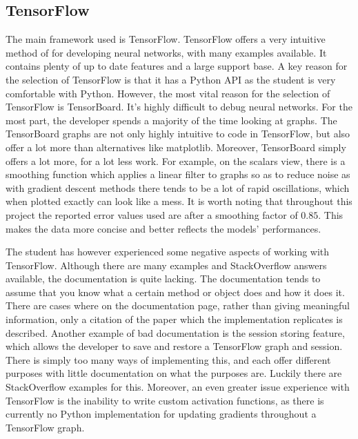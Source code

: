 \documentclass[12pt,a4paper,oneside,oldfontcommands]{memoir}
\begin{document}
\begin{Declaration Of OriginalityOrginality}
\subsection{TensorFlow}
The main framework used is TensorFlow. TensorFlow offers a very intuitive method of for developing neural networks, with many examples available. It contains plenty of up to date features and a large support base. A key reason for the selection of TensorFlow is that it has a Python API as the student is very comfortable with Python. However, the most vital reason for the selection of TensorFlow is TensorBoard. It's highly difficult to debug neural networks. For the most part, the developer spends a majority of the time looking at graphs. The TensorBoard graphs are not only highly intuitive to code in TensorFlow, but also offer a lot more than alternatives like matplotlib. Moreover, TensorBoard simply offers a lot more, for a lot less work. For example, on the scalars view, there is a smoothing function which applies a linear filter to graphs so as to reduce noise as with gradient descent methods there tends to be a lot of rapid oscillations, which when plotted exactly can look like a mess. It is worth noting that throughout this project the reported error values used are after a smoothing factor of \(0.85\). This makes the data more concise and better reflects the models' performances.

The student has however experienced some negative aspects of working with TensorFlow. Although there are many examples and StackOverflow answers available, the documentation is quite lacking. The documentation tends to assume that you know what a certain method or object does and how it does it. There are cases where on the documentation page, rather than giving meaningful information, only a citation of the paper which the implementation replicates is described. Another example of bad documentation is the session storing feature, which allows the developer to save and restore a TensorFlow graph and session. There is simply too many ways of implementing this, and each offer different purposes with little documentation on what the purposes are. Luckily there are StackOverflow examples for this. Moreover, an even greater issue experience with TensorFlow is the inability to write custom activation functions, as there is currently no Python implementation for updating gradients throughout a TensorFlow graph. 


\end{Declaration Of OriginalityOrginality}
\end{document}
